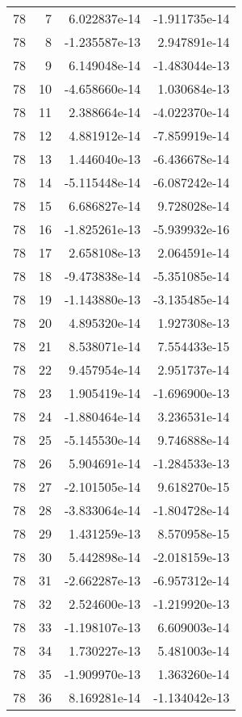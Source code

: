 \begin{tabular}{rrrr}
  78 &    7 &  6.022837e-14 & -1.911735e-14 \\
  78 &    8 & -1.235587e-13 &  2.947891e-14 \\
  78 &    9 &  6.149048e-14 & -1.483044e-13 \\
  78 &   10 & -4.658660e-14 &  1.030684e-13 \\
  78 &   11 &  2.388664e-14 & -4.022370e-14 \\
  78 &   12 &  4.881912e-14 & -7.859919e-14 \\
  78 &   13 &  1.446040e-13 & -6.436678e-14 \\
  78 &   14 & -5.115448e-14 & -6.087242e-14 \\
  78 &   15 &  6.686827e-14 &  9.728028e-14 \\
  78 &   16 & -1.825261e-13 & -5.939932e-16 \\
  78 &   17 &  2.658108e-13 &  2.064591e-14 \\
  78 &   18 & -9.473838e-14 & -5.351085e-14 \\
  78 &   19 & -1.143880e-13 & -3.135485e-14 \\
  78 &   20 &  4.895320e-14 &  1.927308e-13 \\
  78 &   21 &  8.538071e-14 &  7.554433e-15 \\
  78 &   22 &  9.457954e-14 &  2.951737e-14 \\
  78 &   23 &  1.905419e-14 & -1.696900e-13 \\
  78 &   24 & -1.880464e-14 &  3.236531e-14 \\
  78 &   25 & -5.145530e-14 &  9.746888e-14 \\
  78 &   26 &  5.904691e-14 & -1.284533e-13 \\
  78 &   27 & -2.101505e-14 &  9.618270e-15 \\
  78 &   28 & -3.833064e-14 & -1.804728e-14 \\
  78 &   29 &  1.431259e-13 &  8.570958e-15 \\
  78 &   30 &  5.442898e-14 & -2.018159e-13 \\
  78 &   31 & -2.662287e-13 & -6.957312e-14 \\
  78 &   32 &  2.524600e-13 & -1.219920e-13 \\
  78 &   33 & -1.198107e-13 &  6.609003e-14 \\
  78 &   34 &  1.730227e-13 &  5.481003e-14 \\
  78 &   35 & -1.909970e-13 &  1.363260e-14 \\
  78 &   36 &  8.169281e-14 & -1.134042e-13 \\

\end{tabular}
